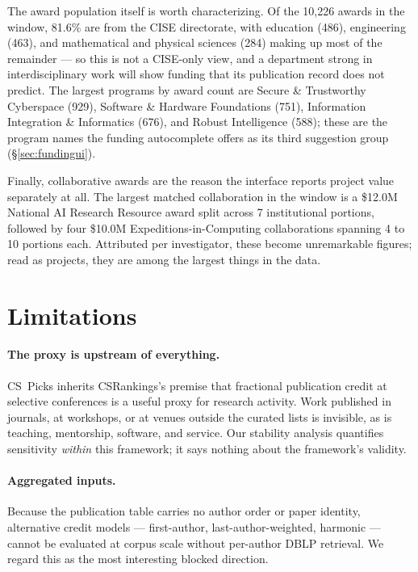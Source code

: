 \documentclass[11pt]{article}
\newcommand{\sys}{CS~Picks}
\newcommand{\csr}{CSRankings}
\begin{document}
The award population itself is worth characterizing. Of the 10{,}226 awards in
the window, 81.6\% are from the CISE directorate, with education (486),
engineering (463), and mathematical and physical sciences (284) making up most
of the remainder --- so this is not a CISE-only view, and a department strong in
interdisciplinary work will show funding that its publication record does not
predict. The largest programs by award count are Secure \& Trustworthy
Cyberspace (929), Software \& Hardware Foundations (751), Information
Integration \& Informatics (676), and Robust Intelligence (588); these are the
program names the funding autocomplete offers as its third suggestion group
(\S\ref{sec:fundingui}).

Finally, collaborative awards are the reason the interface reports project
value separately at all. The largest matched collaboration in the window is a
\$12.0M National AI Research Resource award split across 7 institutional
portions, followed by four \$10.0M Expeditions-in-Computing collaborations
spanning 4 to 10 portions each. Attributed per investigator, these become
unremarkable figures; read as projects, they are among the largest things in
the data.

\section{Limitations}
\label{sec:limitations}

\paragraph{The proxy is upstream of everything.} \sys{} inherits \csr{}'s
premise that fractional publication credit at selective conferences is a useful
proxy for research activity. Work published in journals, at workshops, or at
venues outside the curated lists is invisible, as is teaching, mentorship,
software, and service. Our stability analysis quantifies sensitivity
\emph{within} this framework; it says nothing about the framework's validity.

\paragraph{Aggregated inputs.} Because the publication table carries no author
order or paper identity, alternative credit models --- first-author,
last-author-weighted, harmonic --- cannot be evaluated at corpus scale without
per-author DBLP retrieval. We regard this as the most interesting blocked
direction.
\end{document}
